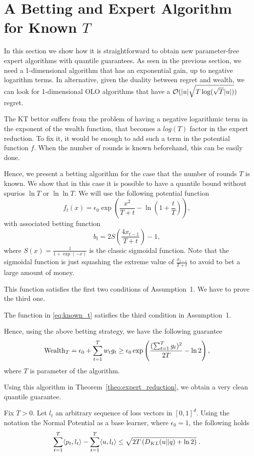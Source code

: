 \section{A Betting and Expert Algorithm for Known $T$}

In this section we show how it is straightforward to obtain new parameter-free expert algorithms with quantile guarantees.
As seen in the previous section, we need a 1-dimensional algorithm that has an exponential gain, up to negative logarithm terms. In alternative, given the duality between regret and wealth, we can look for 1-dimensional \ac{OLO} algorithms that have a $\mathcal{O}(|u|\sqrt{T \log(\sqrt{T} |u|)})$ regret.

The \ac{KT} bettor suffers from the problem of having a negative logarithmic term in the exponent of the wealth function, that becomes a $log(T)$ factor in the expert reduction.
To fix it, it would be enough to add such a term in the potential function $f$. When the number of rounds is known beforehand, this can be easily done.

Hence, we present a betting algorithm for the case that the number of rounds $T$ is known. We show that in this case it is possible to have a quantile bound without spurios $\ln T$ or $\ln \ln T$.
We will use the following potential function
\begin{equation}
\label{eq:known_t}
f_t(x)=\epsilon_0 \exp\left(\frac{x^2}{T+t}-\ln\left(1+\frac{t}{T}\right)\right),
\end{equation}
with associated betting function
\[
b_t=2 S\left(\frac{4 x_{t-1}}{T+t}\right)-1,
\]
where $S(x)=\frac{1}{1+\exp(-x)}$ is the classic sigmoidal function. Note that the sigmoidal function is just squashing the extreme value of
$\frac{x_{t-1}}{T+t}$ to avoid to bet a large amount of money.

This function satisfies the first two conditions of Assumption~1.
We have to prove the third one.

\begin{theorem}
\label{theo:known_t}
The function in \eqref{eq:known_t} satisfies the third condition in Assumption~1.
\end{theorem}


Hence, using the above betting strategy, we have the following guarantee
\[
\operatorname{Wealth}_T = \epsilon_0 + \sum_{t=1}^T w_t g_t \geq \epsilon_0 \exp\left( \frac{(\sum_{t=1}^T g_t)^2}{2 T} - \ln 2\right),
\]
where $T$ is parameter of the algorithm.

Using this algorithm in Theorem~\ref{theo:expert_reduction}, we obtain a very clean quantile guarantee.
\begin{cor}
\label{cor:kt_expert}
Fix $T>0$. Let $l_t$ an arbitrary sequence of loss vectors in $[0,1]^d$. Using the notation the Normal Potential as a base learner, where $\epsilon_0=1$, the following holds
\[
\sum_{t=1}^T \langle p_t, l_t\rangle -\sum_{t=1}^T \langle u , l_t\rangle 
\leq \sqrt{2 T \left(D_{KL}(u||q) +\ln 2 \right)} \; .
\]
\end{cor}

